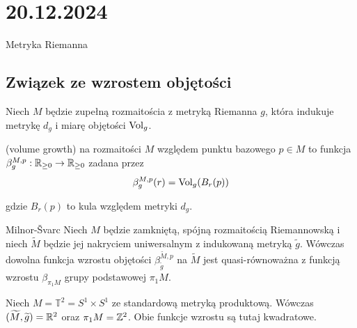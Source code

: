 \section{20.12.2024}{Metryka Riemanna}

\subsection{Związek ze wzrostem objętości}

\begin{definition}{}{}
  Niech $M$ będzie zupełną rozmaitościa z metryką Riemanna $g$, która indukuje metrykę $d_g$ i miarę objętości $\operatorname{Vol}_g$.

   (volume growth) na rozmaitości $M$ względem punktu bazowego $p\in M$ to funkcja $\beta_g^{M,p}:\mathbb{R}_{\geq 0}\to \mathbb{R}_{\geq0}$ zadana przez 
  $$\beta_g^{M,p}(r)=\operatorname{Vol}_g(B_r(p))$$
  
  gdzie $B_r(p)$ to kula względem metryki $d_g$.
\end{definition}

\begin{lemma}{Milnor-\v{S}varc}{}
  Niech $M$ będzie zamkniętą, spójną rozmaitością Riemannowską i niech $\widetilde{M}$ będzie jej nakryciem uniwersalnym z indukowaną metryką $\widetilde{g}$. Wówczas dowolna funkcja wzrostu objętości $\beta_{\widetilde{g}}^{\widetilde{M},p}$ na $\widetilde{M}$ jest quasi-równoważna z funkcją wzrostu $\beta_{\pi_1 M}$ grupy podstawowej $\pi_1M$.
\end{lemma}

\begin{example}
  Niech $M=\mathbb{T}^2=S^1\times S^1$ ze standardową metryką produktową. Wówczas $(\widetilde{M}, \widetilde{g})=\mathbb{R}^2$ oraz $\pi_1M=\mathbb{Z}^2$. Obie funkcje wzrostu są tutaj kwadratowe.
\end{example}

